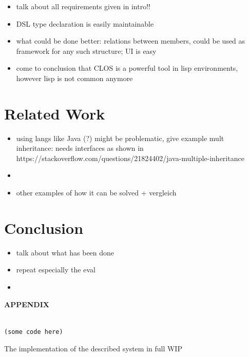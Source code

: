 \documentclass[oribibl]{llncs}
\begin{document}
\begin{itemize}
\item talk about all requirements given in intro!!
\item DSL type declaration is easily maintainable
\item what could be done better: relations between members, could be used as framework for any such structure; UI is easy 
\item come to conclusion that CLOS is a powerful tool in lisp environments, however lisp is not common anymore
\end{itemize}

\section{Related Work}
\label{sec:related}

\begin{itemize}
\item using langs like Java (?) might be problematic, give example mult inheritance: needs interfaces as shown in https://stackoverflow.com/questions/21824402/java-multiple-inheritance
\item 
\item other examples of how it can be solved + vergleich
\end{itemize}


\section{Conclusion}
\label{sec:conclusion}

\begin{itemize}
\item talk about what has been done
\item repeat especially the eval
\item  
\end{itemize} 

\newpage
\nocite{*}



\newpage
    \begin{center}
      {\bf APPENDIX}
    \end{center}
\label{sec:appendix}

\begin{listing}[]%
\begin{verbatim}

(some code here)

\end{verbatim}
\caption{The implementation of the described system in full WIP}
\label{lst:entire-implementation}
\end{listing}
\end{document}
